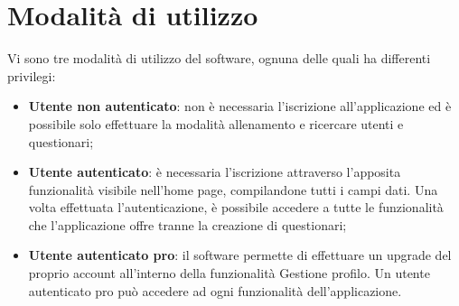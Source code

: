 \newpage
\section{Modalità di utilizzo}
Vi sono tre modalità di utilizzo del software, ognuna delle quali ha differenti privilegi:
\begin{itemize}
	\item \textbf{Utente non autenticato}: non è necessaria l'iscrizione all'applicazione ed è possibile solo effettuare la modalità allenamento e ricercare utenti e questionari;
	\item \textbf{Utente autenticato}: è necessaria l'iscrizione attraverso l'apposita funzionalità visibile nell'home page, compilandone tutti i campi dati. Una volta effettuata l'autenticazione, è possibile accedere a tutte le funzionalità che l'applicazione offre tranne la creazione di questionari;
	\item \textbf{Utente autenticato pro}: il software permette di effettuare un upgrade del proprio account all'interno della funzionalità Gestione profilo. Un utente autenticato pro può accedere ad ogni funzionalità dell'applicazione. 
\end{itemize}
